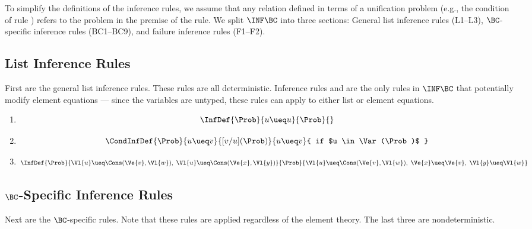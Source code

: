 To simplify the definitions of the inference rules, we assume that any relation
defined in terms of a unification problem (e.g., the condition of rule
) refers to the problem in the premise of the rule. We
split $\INF\BC$ into three sections: General list inference rules (L1--L3),
$\BC$-specific inference rules (BC1--BC9), and failure inference rules
(F1--F2).

\subsection{List Inference Rules}

First are the general list inference rules. These rules are all deterministic.
Inference rules  and  are the only rules
in $\INF\BC$ that potentially modify element equations --- since the variables
are untyped, these rules can apply to either list or element equations.

\begin{enumerate}[(L1), ref=L\arabic*, align=left]
    \item {}
        \[\InfDef
            { \Prob  }{ u \ueq u }
            { \Prob }{}
        \]
    \item {}
        \[\CondInfDef
            {       \Prob  }{ u \ueq v }
            { [v/u](\Prob) }{ u \ueq v }
            { if $u \in \Var(\Prob)$ }
        \]

    \item {}
        \[\InfDef
            { \Prob }{ \Vl{u} \ueq \Cons(\Ve{v}, \Vl{w}), \;
                       \Vl{u} \ueq \Cons(\Ve{x}, \Vl{y}) }
            { \Prob }{ \Vl{u} \ueq \Cons(\Ve{v}, \Vl{w}), \;
                       \Ve{x} \ueq \Ve{v}, \; \Vl{y} \ueq \Vl{w} }
        \]
\end{enumerate}

\subsection{$\BC$-Specific Inference Rules}

Next are the $\BC$-specific rules. Note that these rules are applied regardless
of the element theory. The last three are nondeterministic.

